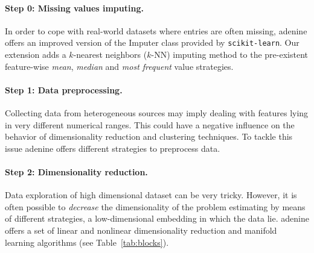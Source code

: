 \documentclass[twoside,11pt]{article}
\makeatletter
\newcommand{\ade}{{\sc adenine}\@\xspace}
\makeatother
\begin{document}
\paragraph{Step 0: Missing values imputing.}
  In order to cope with real-world datasets where entries are often missing, \ade offers an improved version of the Imputer class provided by \texttt{scikit-learn}. Our extension adds a $k$-nearest neighbors ($k$-NN) imputing method to the pre-existent feature-wise \emph{mean}, \emph{median} and \emph{most frequent} value strategies. \citep{troyanskaya2001missing}
  
\paragraph{Step 1: Data preprocessing.}
  Collecting data from heterogeneous sources may imply dealing with features lying in very different numerical ranges. This could have a negative influence on the behavior of dimensionality reduction and clustering techniques. To tackle this issue \ade offers different strategies to preprocess data.

\paragraph{Step 2: Dimensionality reduction.}
  Data exploration of high dimensional dataset can be very tricky. 
  However, it is often possible to \emph{decrease} the dimensionality of the problem estimating by means of different strategies, a low-dimensional embedding in which the data lie. %
  \ade offers a set of linear and nonlinear dimensionality reduction and manifold learning algorithms (see Table~\ref{tab:blocks}).
\end{document}
